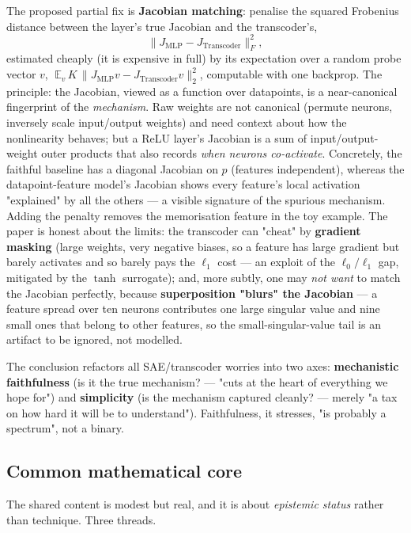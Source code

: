 The proposed partial fix is \textbf{Jacobian matching}: penalise the squared Frobenius distance between the layer's true Jacobian and the transcoder's,
\[
\bigl\lVert J_{\mathrm{MLP}} - J_{\mathrm{Transcoder}}\bigr\rVert_F^2,
\]
estimated cheaply (it is expensive in full) by its expectation over a random probe vector $v$, $\;\mathbb{E}_v\,K\,\lVert J_{\mathrm{MLP}}v - J_{\mathrm{Transcoder}}v\rVert_2^2$, computable with one backprop. The principle: the Jacobian, viewed as a function over datapoints, is a near-canonical fingerprint of the \emph{mechanism}. Raw weights are not canonical (permute neurons, inversely scale input/output weights) and need context about how the nonlinearity behaves; but a ReLU layer's Jacobian is a sum of input/output-weight outer products that also records \emph{when neurons co-activate}. Concretely, the faithful baseline has a diagonal Jacobian on $p$ (features independent), whereas the datapoint-feature model's Jacobian shows every feature's local activation "explained" by all the others --- a visible signature of the spurious mechanism. Adding the penalty removes the memorisation feature in the toy example. The paper is honest about the limits: the transcoder can "cheat" by \textbf{gradient masking} (large weights, very negative biases, so a feature has large gradient but barely activates and so barely pays the $\ell_1$ cost --- an exploit of the $\ell_0/\ell_1$ gap, mitigated by the $\tanh$ surrogate); and, more subtly, one may \emph{not want} to match the Jacobian perfectly, because \textbf{superposition "blurs" the Jacobian} --- a feature spread over ten neurons contributes one large singular value and nine small ones that belong to other features, so the small-singular-value tail is an artifact to be ignored, not modelled.

The conclusion refactors all SAE/transcoder worries into two axes: \textbf{mechanistic faithfulness} (is it the true mechanism? --- "cuts at the heart of everything we hope for") and \textbf{simplicity} (is the mechanism captured cleanly? --- merely "a tax on how hard it will be to understand"). Faithfulness, it stresses, "is probably a spectrum", not a binary.


\subsection*{Common mathematical core}

The shared content is modest but real, and it is about \emph{epistemic status} rather than technique. Three threads.

